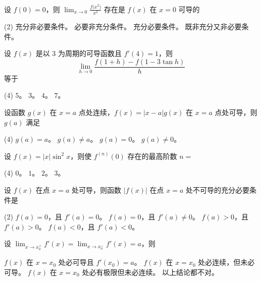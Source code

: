 \begin{ti}
	设 $f(0) = 0$，则 $\lim_{x \to 0} \frac{f\bigl(x^2\bigr)}{x^2}$ 存在是 $f(x)$ 在 $x=0$ 可导的
	\begin{tasks}(2)
		\task 充分非必要条件。
		\task 必要非充分条件。
		\task 充分必要条件。
		\task 既非充分又非必要条件。
	\end{tasks}
\end{ti}

\begin{ti}
	设 $f(x)$ 是以 $3$ 为周期的可导函数且 $f'(4) = 1$，则
	\[\lim_{h \to 0} \frac{f(1+h) - f(1-3\tan h)}{h}\]
	等于
	\begin{tasks}(4)
		\task $5$。
		\task $3$。
		\task $4$。
		\task $7$。
	\end{tasks}
\end{ti}

\begin{ti}
  设函数 $g(x)$ 在 $x=a$ 点处连续，$f(x) = |x-a| g(x)$ 在 $x=a$ 点处可导，则 $g(a)$ 满足
  \begin{tasks}(4)
    \task $g(a) = a$。
    \task $g(a) \ne a$。
    \task $g(a) = 0$。
    \task $g(a) \ne 0$。
  \end{tasks}
\end{ti}

\begin{ti}
	设 $f(x) = |x| \sin^2x$，则使 $f^{(n)}(0)$ 存在的最高阶数 $n = $
	\begin{tasks}(4)
		\task $0$。
		\task $1$。
		\task $2$。
		\task $3$。
	\end{tasks}
\end{ti}

\begin{ti}
	设 $f(x)$ 在点 $x=a$ 处可导，则函数 $|f(x)|$ 在点 $x=a$ 处不可导的充分必要条件是
	\begin{tasks}(2)
		\task $f(a) = 0$，且 $f'(a) = 0$。
		\task $f(a) = 0$，且 $f'(a) \ne 0$。
		\task $f(a) > 0$，且 $f'(a) > 0$。
		\task $f(a) < 0$，且 $f'(a) < 0$。
	\end{tasks}
\end{ti}

\begin{ti}
	设 $\lim_{x \to x_0^+} f'(x) = \lim_{x \to x_0^-} f'(x) = a$，则
	\begin{tasks}
		\task $f(x)$ 在 $x=x_0$ 处必可导且 $f'(x_0) = a$。
		\task $f(x)$ 在 $x=x_0$ 处必连续，但未必可导。
		\task $f(x)$ 在 $x=x_0$ 处必有极限但未必连续。
		\task 以上结论都不对。
	\end{tasks}
\end{ti}

